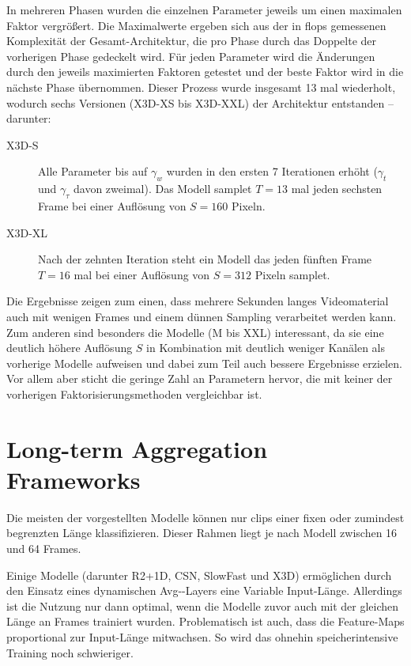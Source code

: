 In mehreren Phasen wurden die einzelnen Parameter jeweils um einen maximalen Faktor vergrößert.
Die Maximalwerte ergeben sich aus der in \gls{flops} gemessenen Komplexität der Gesamt-Architektur, die pro Phase durch das Doppelte der vorherigen Phase gedeckelt wird.
Für jeden Parameter wird die Änderungen durch den jeweils maximierten Faktoren getestet und der beste Faktor wird in die nächste Phase übernommen.
Dieser Prozess wurde insgesamt 13 mal wiederholt, wodurch sechs Versionen (X3D-XS bis X3D-XXL) der Architektur entstanden -- darunter:

\begin{description}
    \item[X3D-S] Alle Parameter bis auf $\gamma_w$ wurden in den ersten 7 Iterationen erhöht ($\gamma_t$ und $\gamma_\tau$ davon zweimal).
    Das Modell samplet $T=13$ mal jeden sechsten Frame bei einer Auflösung von $S=160$ Pixeln.
    \item[X3D-XL] Nach der zehnten Iteration steht ein Modell das jeden fünften Frame $T=16$ mal bei einer Auflösung von $S=312$ Pixeln samplet.
\end{description}

Die Ergebnisse zeigen zum einen, dass mehrere Sekunden langes Videomaterial auch mit wenigen Frames und einem dünnen Sampling verarbeitet werden kann.
Zum anderen sind besonders die Modelle (M bis XXL) interessant, da sie eine deutlich höhere Auflösung $S$ in Kombination mit deutlich weniger Kanälen als vorherige Modelle aufweisen und dabei zum Teil auch bessere Ergebnisse erzielen.
Vor allem aber sticht die geringe Zahl an Parametern hervor, die mit keiner der vorherigen Faktorisierungsmethoden vergleichbar ist.


\section{Long-term Aggregation Frameworks}
\label{sec:long-term-aggregation-frameworks}

Die meisten der vorgestellten Modelle können nur \glspl{clip} einer fixen oder zumindest begrenzten Länge klassifizieren.
Dieser Rahmen liegt je nach Modell zwischen 16 und 64 Frames.

Einige Modelle (darunter R2+1D, CSN, SlowFast und X3D) ermöglichen durch den Einsatz eines dynamischen Avg-\pool-Layers eine Variable Input-Länge.
Allerdings ist die Nutzung nur dann optimal, wenn die Modelle zuvor auch mit der gleichen Länge an Frames trainiert wurden.
Problematisch ist auch, dass die Feature-Maps proportional zur Input-Länge mitwachsen.
So wird das ohnehin speicherintensive Training noch schwieriger.

